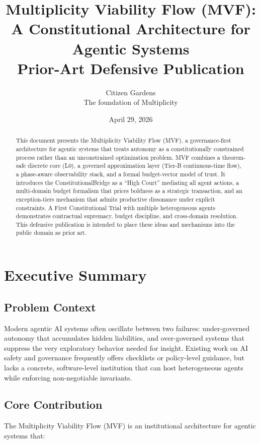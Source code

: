\documentclass[11pt]{article}
\title{Multiplicity Viability Flow (MVF):\\
A Constitutional Architecture for Agentic Systems\\[4pt]
\large Prior-Art Defensive Publication}
\author{Citizen Gardens \\ The foundation of Multiplicity}
\date{April 29, 2026}
\begin{document}
\maketitle

\begin{abstract}
This document presents the Multiplicity Viability Flow (MVF), a governance-first architecture for agentic systems that treats autonomy as a constitutionally constrained process rather than an unconstrained optimization problem. MVF combines a theorem-safe discrete core (L0), a governed approximation layer (Tier-B continuous-time flow), a phase-aware observability stack, and a formal budget-vector model of trust. It introduces the ConstitutionalBridge as a ``High Court'' mediating all agent actions, a multi-domain budget formalism that prices boldness as a strategic transaction, and an exception-tiers mechanism that admits productive dissonance under explicit constraints. A First Constitutional Trial with multiple heterogeneous agents demonstrates contractual supremacy, budget discipline, and cross-domain resolution. This defensive publication is intended to place these ideas and mechanisms into the public domain as prior art.
\end{abstract}
\newpage
\tableofcontents

\section{Executive Summary}

\subsection{Problem Context}

Modern agentic AI systems often oscillate between two failures: under-governed autonomy that accumulates hidden liabilities, and over-governed systems that suppress the very exploratory behavior needed for insight. Existing work on AI safety and governance frequently offers checklists or policy-level guidance, but lacks a concrete, software-level institution that can host heterogeneous agents while enforcing non-negotiable invariants.

\subsection{Core Contribution}

The Multiplicity Viability Flow (MVF) is an institutional architecture for agentic systems that:
\end{document}
